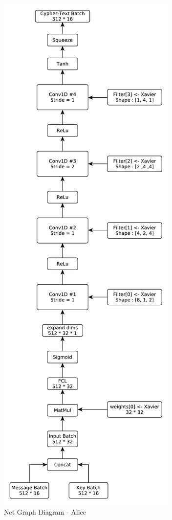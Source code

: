\documentclass[12pt]{article}
\begin{document}
	\begin{figure}[!htbp]
		\begin{center}
			\includegraphics[height=0.93\textheight]{Alice-Diagram}
			\begin{center}
				\caption{ Net Graph Diagram - Alice}
			\end{center}
		\end{center}
	\end{figure}
\end{document}
